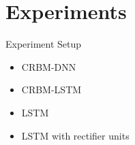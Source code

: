 \section{Experiments}
	\begin{frame}[t]{Experiment Setup}
	\begin{minipage}[t]{\linewidth}
	 \begin{itemize}[<+->]
	  \item<only@1> CRBM-DNN 
	  \item<only@2> CRBM-LSTM
	  \item<only@3> LSTM
	  \item<only@4> LSTM with rectifier units
	\end{itemize}
	\end{minipage}\hspace{5mm}
	

\end{frame}
